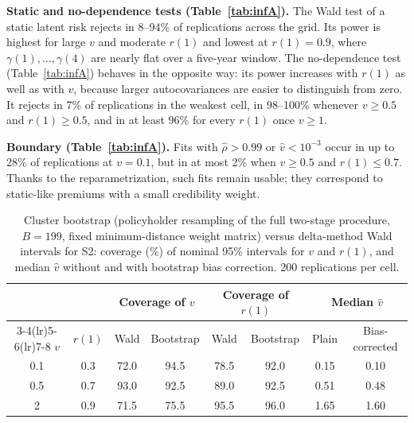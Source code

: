\documentclass[mathematics,article,submit,moreauthors]{Definitions/mdpi}
\begin{document}
\textbf{Static and no-dependence tests (Table~\ref{tab:infA}).} The Wald test of a static latent risk rejects in 8--94\% of replications across the grid. Its power is highest for large $v$ and moderate $r(1)$ and lowest at $r(1)=0.9$, where $\gamma(1),\dots,\gamma(4)$ are nearly flat over a five-year window. The no-dependence test (Table~\ref{tab:infA}) behaves in the opposite way: its power increases with $r(1)$ as well as with $v$, because larger autocovariances are easier to distinguish from zero. It rejects in 7\% of replications in the weakest cell, in 98--100\% whenever $v\ge0.5$ and $r(1)\ge0.5$, and in at least 96\% for every $r(1)$ once $v\ge1$.

\textbf{Boundary (Table~\ref{tab:infA}).} Fits with $\hat\rho>0.99$ or $\hat v<10^{-3}$ occur in up to 28\% of replications at $v=0.1$, but in at most 2\% when $v\ge0.5$ and $r(1)\le0.7$. Thanks to the reparametrization, such fits remain usable; they correspond to static-like premiums with a small credibility weight.

\begin{table}[H]
\caption{Cluster bootstrap (policyholder resampling of the full two-stage procedure, $B=199$, fixed minimum-distance weight matrix) versus delta-method Wald intervals for S2: coverage (\%) of nominal 95\% intervals for $v$ and $r(1)$, and median $\hat v$ without and with bootstrap bias correction. 200 replications per cell.\label{tab:boot}}
\small
\begin{tabular*}{\textwidth}{@{\extracolsep{\fill}}cccccccc@{}}
\toprule
 & & \multicolumn{2}{c}{Coverage of $v$} & \multicolumn{2}{c}{Coverage of $r(1)$} & \multicolumn{2}{c}{Median $\hat v$} \\
\cmidrule(lr){3-4}\cmidrule(lr){5-6}\cmidrule(lr){7-8}
$v$ & $r(1)$ & Wald & Bootstrap & Wald & Bootstrap & Plain & Bias-corrected \\
\midrule
0.1 & 0.3 & 72.0 & 94.5 & 78.5 & 92.0 & 0.15 & 0.10 \\
0.5 & 0.7 & 93.0 & 92.5 & 89.0 & 92.5 & 0.51 & 0.48 \\
2 & 0.9 & 71.5 & 75.5 & 95.5 & 96.0 & 1.65 & 1.60 \\
\bottomrule
\end{tabular*}
\end{table}
\end{document}
